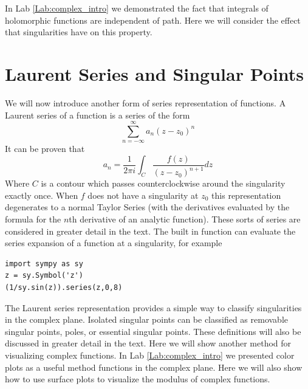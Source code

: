 

In Lab \ref{Lab:complex_intro} we demonstrated the fact that integrals of holomorphic functions are independent of path.
Here we will consider the effect that singularities have on this property.

\section*{Laurent Series and Singular Points}

We will now introduce another form of series representation of functions.
A Laurent series of a function is a series of the form
\[\sum_{n= -\infty}^{\infty} a_n (z-z_0)^n\]
It can be proven that
\[a_n = \frac{1}{2\pi i} \int_C \frac{f(z)}{(z-z_0)^{n+1}} dz\]
Where $C$ is a contour which passes counterclockwise around the singularity exactly once.
When $f$ does not have a singularity at $z_0$ this representation degenerates to a normal Taylor Series (with the derivatives evaluated by the formula for the $n$th derivative of an analytic function).
These sorts of series are considered in greater detail in the text.
The built in function  can evaluate the series expansion of a function at a singularity, for example
\begin{lstlisting}
import sympy as sy
z = sy.Symbol('z')
(1/sy.sin(z)).series(z,0,8)
\end{lstlisting}

The Laurent series representation provides a simple way to classify singularities in the complex plane.
Isolated singular points can be classified as removable singular points, poles, or essential singular points.
These definitions will also be discussed in greater detail in the text.
Here we will show another method for visualizing complex functions.
In Lab \ref{Lab:complex_intro} we presented color plots as a useful method functions in the complex plane. 
Here we will also show how to use surface plots to visualize the modulus of complex functions.

